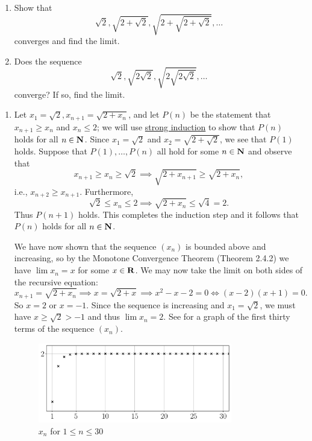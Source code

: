 \documentclass{lew98_solutions}
\begin{document}
\begin{exercise}
\label{ex:2.4.3}
    \begin{enumerate}
        \item Show that
        \[
            \sqrt{2}, \sqrt{2 + \sqrt{2}}, \sqrt{2 + \sqrt{2 + \sqrt{2}}}, \ldots
        \]
        converges and find the limit.

        \item Does the sequence
        \[
            \sqrt{2}, \sqrt{2 \sqrt{2}}, \sqrt{2 \sqrt{2 \sqrt{2}}}, \ldots
        \]
        converge? If so, find the limit.
    \end{enumerate}
\end{exercise}

\begin{solution}
    \begin{enumerate}
        \item Let \( x_1 = \sqrt{2}, x_{n+1} = \sqrt{2 + x_n} \), and let \( P(n) \) be the statement that \( x_{n+1} \geq x_n \) and \( x_n \leq 2 \); we will use \href{https://en.wikipedia.org/wiki/Mathematical_induction#Complete_(strong)_induction}{strong induction} to show that \( P(n) \) holds for all \( n \in \mathbf{N} \). Since \( x_1 = \sqrt{2} \) and \( x_2 = \sqrt{2 + \sqrt{2}} \), we see that \( P(1) \) holds. Suppose that \( P(1), \ldots, P(n) \) all hold for some \( n \in \mathbf{N} \) and observe that
        \[
            x_{n+1} \geq x_n \geq \sqrt{2} \implies \sqrt{2 + x_{n+1}} \geq \sqrt{2 + x_n},
        \]
        i.e., \( x_{n+2} \geq x_{n+1} \). Furthermore,
        \[
            \sqrt{2} \leq x_n \leq 2 \implies \sqrt{2 + x_n} \leq \sqrt{4} = 2.  
        \]
        Thus \( P(n + 1) \) holds. This completes the induction step and it follows that \( P(n) \) holds for all \( n \in \mathbf{N} \).

        We have now shown that the sequence \( (x_n) \) is bounded above and increasing, so by the Monotone Convergence Theorem (Theorem 2.4.2) we have \( \lim x_n = x \) for some \( x \in \mathbf{R} \). We may now take the limit on both sides of the recursive equation:
        \[
            x_{n+1} = \sqrt{2 + x_n} \implies x = \sqrt{2 + x} \implies x^2 - x - 2 = 0 \iff (x - 2)(x + 1) = 0.
        \]
        So \( x = 2 \) or \( x = -1 \). Since the sequence is increasing and \( x_1 = \sqrt{2} \), we must have \( x \geq \sqrt{2} > -1 \) and thus \( \lim x_n = 2 \). See  for a graph of the first thirty terms of the sequence \( (x_n) \).
        \begin{figure}[H]
            \centering
            \includegraphics[width=0.8\textwidth]{UA_Figures/UA_ex2_4_3_fig_1.pdf}
            \caption{\( x_n \) for \( 1 \leq n \leq 30 \)}
            \label{fig:ex2.4.3_1}
        \end{figure}


\end{enumerate}
\end{solution}
\end{document}
